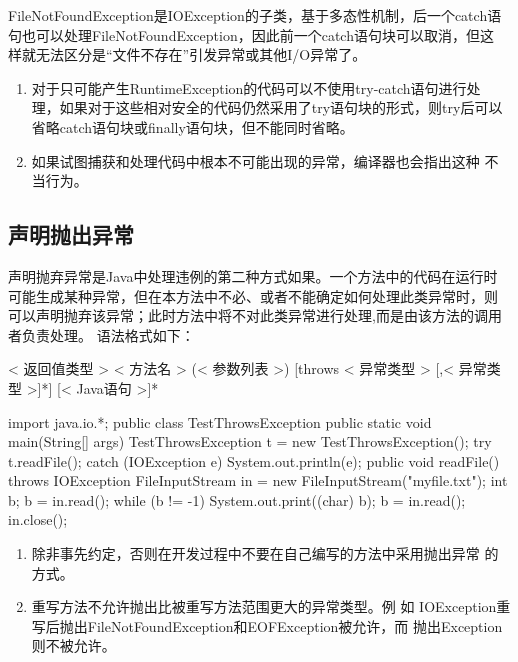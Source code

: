 FileNotFoundException是IOException的子类，基于多态性机制，后一个catch语
句也可以处理FileNotFoundException，因此前一个catch语句块可以取消，但这
样就无法区分是“文件不存在”引发异常或其他I/O异常了。


\begin{enumerate}
\item 对于只可能产生RuntimeException的代码可以不使用try-catch语句进行处
  理，如果对于这些相对安全的代码仍然采用了try语句块的形式，则try后可以
  省略catch语句块或finally语句块，但不能同时省略。
\item 如果试图捕获和处理代码中根本不可能出现的异常，编译器也会指出这种
  不当行为。
\end{enumerate}

\subsection{声明抛出异常}
 
声明抛弃异常是Java中处理违例的第二种方式如果。一个方法中的代码在运行时
可能生成某种异常，但在本方法中不必、或者不能确定如何处理此类异常时，则
可以声明抛弃该异常；此时方法中将不对此类异常进行处理,而是由该方法的调用
者负责处理。 语法格式如下：

\begin{javaCode}
  [< 修饰符 >] < 返回值类型 > < 方法名 > (< 参数列表 >) [throws < 异常类型 > [,< 异常类型 >]*] {
    [< Java语句 >]*
  }
\end{javaCode}


\begin{javaCode}
import java.io.*;
public class TestThrowsException {
  public static void main(String[] args) {
    TestThrowsException t = new TestThrowsException();
    try {
      t.readFile();
    } catch (IOException e) {
      System.out.println(e);
    }
  }
  public void readFile() throws IOException {
    FileInputStream in = new FileInputStream("myfile.txt");
    int b;
    b = in.read();
    while (b != -1) {
      System.out.print((char) b);
      b = in.read();
    }
    in.close();
  }
}
\end{javaCode}
 

\begin{enumerate}
\item 除非事先约定，否则在开发过程中不要在自己编写的方法中采用抛出异常
  的方式。
\item 重写方法不允许抛出比被重写方法范围更大的异常类型。例
  如 IOException重写后抛出FileNotFoundException和EOFException被允许，而
  抛出Exception则不被允许。
\end{enumerate}
 
